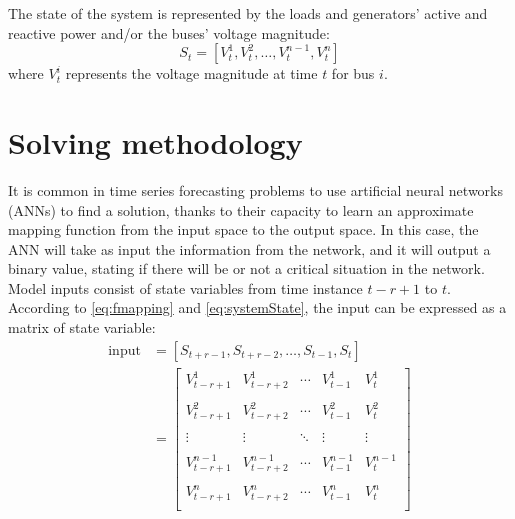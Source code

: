 The state of the system is represented by the loads and generators' active and reactive power and/or the buses' voltage magnitude:
\begin{equation} \label{eq:systemState}
    S_t = [V^1_t,V^2_t,\dots,V^{n-1}_t,V^n_t]
\end{equation}
\noindent where $V^i_t$ represents the voltage magnitude at time $t$ for bus $i$.


\section{Solving methodology}
\label{sec:sm}
It is common in time series forecasting problems to use artificial neural networks (\glspl{ANN}) to find a solution, thanks to their capacity to learn an approximate mapping function from the input space to the output space. In this case, the \gls{ANN} will take as input the information from the network, and it will output a binary value, stating if there will be or not a critical situation in the network. \\

Model inputs consist of state variables from time instance $t-r+1$ to $t$. According to \ref{eq:fmapping} and \ref{eq:systemState}, the input can be expressed as a matrix of state variable:
\begin{equation}
  \begin{aligned}
    \text{input} & = [S_{t+r-1},S_{t+r-2},\dots,S_{t-1},S_{t}]\\
        & = 
        \begin{bmatrix}
         V^1_{t-r+1} & V^1_{t-r+2} & \cdots & V^1_{t-1} & V^1_{t} \\
         & & & & \\
         
         V^2_{t-r+1} & V^2_{t-r+2} & \cdots & V^2_{t-1} & V^2_{t} \\
         & & & & \\
         
         \vdots & \vdots & \ddots & \vdots & \vdots \\
         & & & & \\
         
         V^{n-1}_{t-r+1} & V^{n-1}_{t-r+2} & \cdots & V^{n-1}_{t-1} & V^{n-1}_{t} \\
         & & & & \\
         
         V^n_{t-r+1} & V^n_{t-r+2} & \cdots & V^n_{t-1} & V^n_{t} \\
        \end{bmatrix}
  \end{aligned}
\end{equation}

